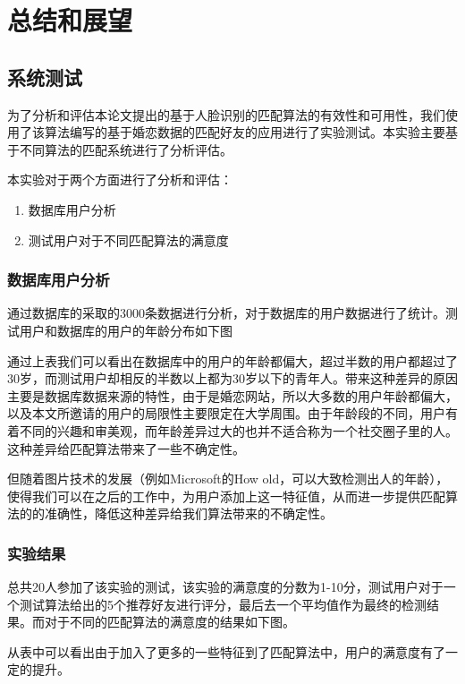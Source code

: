 
\chapter{总结和展望}
\section{系统测试}
为了分析和评估本论文提出的基于人脸识别的匹配算法的有效性和可用性，我们使用了该算法编写的基于婚恋数据的匹配好友的应用进行了实验测试。本实验主要基于不同算法的匹配系统进行了分析评估。

本实验对于两个方面进行了分析和评估：
\begin{enumerate}
\item 数据库用户分析
\item 测试用户对于不同匹配算法的满意度
\end{enumerate}
\subsection{数据库用户分析}
通过数据库的采取的3000条数据进行分析，对于数据库的用户数据进行了统计。测试用户和数据库的用户的年龄分布如下图


通过上表我们可以看出在数据库中的用户的年龄都偏大，超过半数的用户都超过了30岁，而测试用户却相反的半数以上都为30岁以下的青年人。带来这种差异的原因主要是数据库数据来源的特性，由于是婚恋网站，所以大多数的用户年龄都偏大，以及本文所邀请的用户的局限性主要限定在大学周围。由于年龄段的不同，用户有着不同的兴趣和审美观，而年龄差异过大的也并不适合称为一个社交圈子里的人。这种差异给匹配算法带来了一些不确定性。

但随着图片技术的发展（例如Microsoft的How old，可以大致检测出人的年龄），使得我们可以在之后的工作中，为用户添加上这一特征值，从而进一步提供匹配算法的的准确性，降低这种差异给我们算法带来的不确定性。

\subsection{实验结果}
总共20人参加了该实验的测试，该实验的满意度的分数为1-10分，测试用户对于一个测试算法给出的5个推荐好友进行评分，最后去一个平均值作为最终的检测结果。而对于不同的匹配算法的满意度的结果如下图。

从表中可以看出由于加入了更多的一些特征到了匹配算法中，用户的满意度有了一定的提升。



